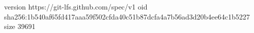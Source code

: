 version https://git-lfs.github.com/spec/v1
oid sha256:1b540af65fd417aaa59f502cfda40c51b87dcfa4a7b56ad3d20b4ee64c1b5227
size 39691
